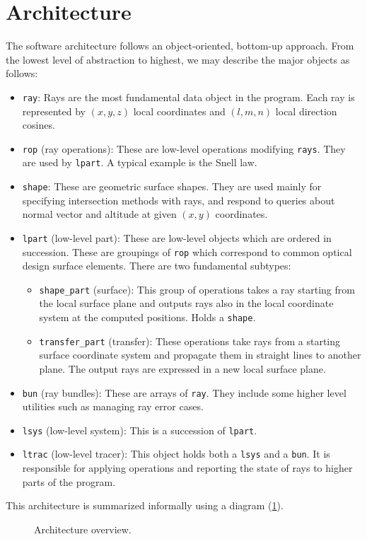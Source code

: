 \section{Architecture}
The software architecture follows an object-oriented, bottom-up approach.
From the lowest level of abstraction to highest, we may describe the
major objects as follows:

\begin{itemize}
\item \lstinline{ray}: Rays are the most fundamental data object in the
program.  Each ray is represented by $(x, y, z)$ local coordinates and $(l, m,
n)$ local direction cosines.
\item \lstinline{rop} (ray operations): These are low-level operations
modifying \lstinline{rays}.  They are used by \lstinline{lpart}.
A typical example is the Snell law.
\item \lstinline{shape}: These are geometric surface shapes. They are used
mainly for specifying intersection methods with rays, and respond to queries
about normal vector and altitude at given $(x, y)$ coordinates.
\item \lstinline{lpart} (low-level part): These are low-level objects which
are ordered in succession. These are groupings of \lstinline{rop}
which correspond to common optical design surface elements. There are two
fundamental subtypes:
\begin{itemize}
\item \lstinline{shape_part} (surface): This group of operations takes a ray
starting from the local surface plane and outputs rays also in the local
coordinate system at the computed positions. Holds a \lstinline{shape}.
\item \lstinline{transfer_part} (transfer): These operations take rays from a
starting surface coordinate system and propagate them in straight lines to
another plane. The output rays are expressed in a new local surface plane.
\end{itemize}
\item \lstinline{bun} (ray bundles): These are arrays of \lstinline{ray}. They
include some higher level utilities such as managing ray error cases.
\item \lstinline{lsys} (low-level system): This is a succession of
\lstinline{lpart}.
\item \lstinline{ltrac} (low-level tracer): This object holds both a
\lstinline{lsys} and a \lstinline{bun}. It is responsible for applying
operations and reporting the state of rays to higher parts of the program.
\end{itemize}

This architecture is summarized informally using a diagram
(\cref{fig:arch-overview}).

\begin{figure}

\caption{\label{fig:arch-overview} Architecture overview.}
\end{figure}
